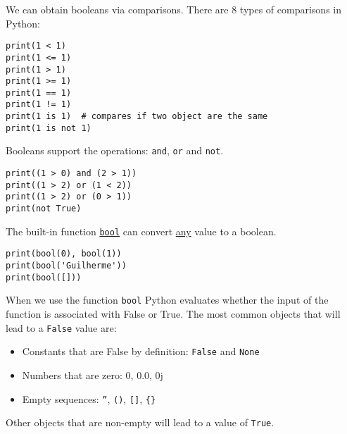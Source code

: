\documentclass[12pt, a4paper]{article}
\begin{document}
We can obtain booleans via comparisons. There are 8 types of comparisons in Python:
\lstset{language=jupyter-python,label= ,caption= ,captionpos=b,numbers=none}
\begin{lstlisting}
print(1 < 1)
print(1 <= 1)
print(1 > 1)
print(1 >= 1)
print(1 == 1)
print(1 != 1)
print(1 is 1)  # compares if two object are the same
print(1 is not 1)
\end{lstlisting}
Booleans support the operations: \texttt{and}, \texttt{or} and \texttt{not}.
\lstset{language=jupyter-python,label= ,caption= ,captionpos=b,numbers=none}
\begin{lstlisting}
print((1 > 0) and (2 > 1))
print((1 > 2) or (1 < 2))
print((1 > 2) or (0 > 1))
print(not True)
\end{lstlisting}
The built-in function \href{https://docs.python.org/3.6/library/functions.html?\#bool}{\texttt{bool}} can convert \uline{any} value to a boolean.
\lstset{language=jupyter-python,label= ,caption= ,captionpos=b,numbers=none}
\begin{lstlisting}
print(bool(0), bool(1))
print(bool('Guilherme'))
print(bool([]))
\end{lstlisting}
When we use the function \texttt{bool} Python evaluates whether the input of the function is associated with False or True.
The most common objects that will lead to a \texttt{False} value are:
\begin{itemize}
\item Constants that are False by definition: \texttt{False} and \texttt{None}
\item Numbers that are zero: 0, 0.0, 0j
\item Empty sequences: \texttt{''}, \texttt{()}, \texttt{[]}, \texttt{\{\}}
\end{itemize}
Other objects that are non-empty will lead to a value of \texttt{True}.
\end{document}
